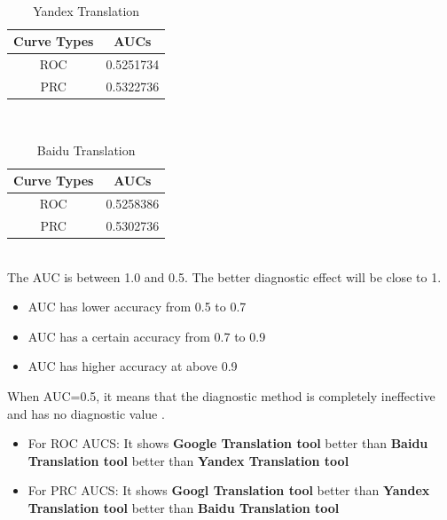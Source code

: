 \documentclass[conference]{IEEEtran}
\begin{document}
\begin{CJK*}{UTF8}{gbsn}
\begin{enumerate}
\begin{table}[h]
  \end{table}\\
   \begin{table}[h]
     \caption {Yandex Translation}
     \begin{center}
       \begin{tabular}{|c|c|}
         \hline
         Curve Types & AUCs \\
         \hline\hline
         ROC & 0.5251734 \\
         \hline
         PRC & 0.5322736 \\
         \hline
       \end{tabular}
     \end{center}
   \end{table}\\
  \begin{table}[h]
    \caption {Baidu Translation}
    \begin{center}
      \begin{tabular}{|c|c|}
        \hline
        Curve Types & AUCs \\
        \hline\hline
        ROC & 0.5258386 \\
        \hline
        PRC & 0.5302736 \\
        \hline
      \end{tabular}
    \end{center}
  \end{table}\\
  The AUC is between 1.0 and 0.5. The better diagnostic effect will be close to 1.
  \begin{itemize}
  \item AUC has lower accuracy from 0.5 to 0.7
  \item AUC has a certain accuracy from 0.7 to 0.9
  \item AUC has higher accuracy at above 0.9
  \end{itemize}
  When AUC=0.5, it means that the diagnostic method is completely ineffective
  and has no diagnostic value \cite{baiduROC}.
  \begin{itemize}
  \item For ROC AUCS: It shows \textbf{Google Translation tool} better than
    \textbf{Baidu Translation tool} better than \textbf{Yandex Translation tool}
    \item For PRC AUCS: It shows \textbf{Googl Translation tool} better than
      \textbf{Yandex Translation tool} better than \textbf{Baidu Translation
        tool}
  \end{itemize}


\end{enumerate}
\end{CJK*}
\end{document}
